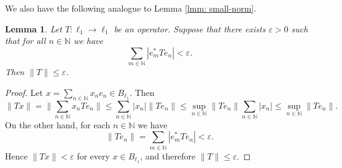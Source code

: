 \documentclass[11pt]{amsart}
\theoremstyle{plain}
\newtheorem{lemma}[theorem]{Lemma}
\theoremstyle{definition}
\numberwithin{equation}{section}
\newcommand{\norm}[1]{\lVert #1 \rVert}
\newcommand{\N}{\mathbb{N}}
\renewcommand{\leq}{\leqslant}
\begin{document}
We also have the following analogue to Lemma \ref{lmm: small-norm}.

\begin{lemma}\label{lmm: small-norm-ell1}
    Let $T \colon \ell_1 \to \ell_1$ be an operator. Suppose that there exists $\varepsilon > 0$ such that for all $n \in \N$ we have
    \begin{equation*}
        \sum_{m \in \N} |e^*_m T e_n| < \varepsilon.
    \end{equation*}
    Then $\norm{T} \leq \varepsilon$.
\end{lemma}
\begin{proof}
    Let $x = \sum_{n \in \N} x_n e_n \in B_{\ell_1}$. Then
    \begin{equation*}
        \norm{Tx} = \norm{\sum_{n \in \N} x_n T e_n} \leq \sum_{n \in \N} |x_n| \norm{T e_n} \leq \sup_{n \in \N} \norm{T e_n} \sum_{n \in \N} |x_n| \leq \sup_{n \in \N} \norm{T e_n}.
    \end{equation*}
    On the other hand, for each $n \in \N$ we have
    \begin{equation*}
        \norm{T e_n} = \sum_{m \in \N} |e_m^* T e_n| < \varepsilon.
    \end{equation*}
    Hence $\norm{Tx} < \varepsilon$ for every $x \in B_{\ell_1}$, and therefore $\norm{T} \leq \varepsilon$.
\end{proof}
\end{document}
